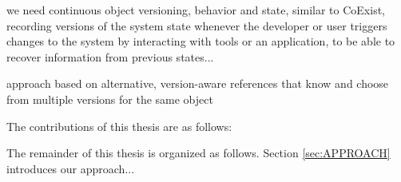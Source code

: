 we need continuous object versioning, behavior and state, similar to CoExist, recording versions of the system state whenever the developer or user triggers changes to the system by interacting with tools or an application, to be able to recover information from previous states...

approach based on alternative, version-aware references that know and choose from multiple versions for the same object




The contributions of this thesis are as follows:

The remainder of this thesis is organized as follows. Section \ref{sec:APPROACH} introduces our approach...
